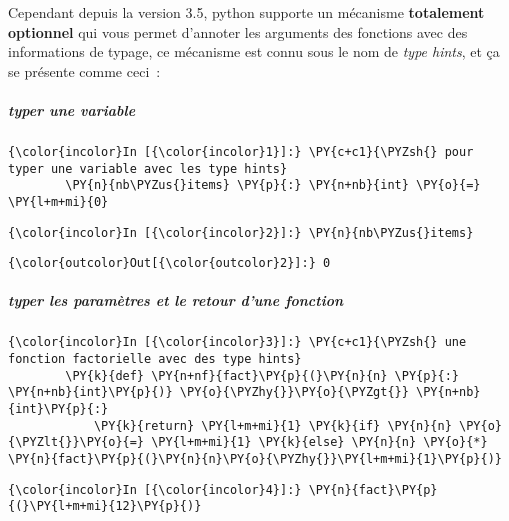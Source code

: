     Cependant depuis la version 3.5, python supporte un mécanisme
\textbf{totalement optionnel} qui vous permet d'annoter les arguments
des fonctions avec des informations de typage, ce mécanisme est connu
sous le nom de \emph{type hints}, et ça se présente comme ceci~:

    \hypertarget{typer-une-variable}{%
\subparagraph{typer une variable}\label{typer-une-variable}}

    \begin{Verbatim}[commandchars=\\\{\},frame=single,framerule=0.3mm,rulecolor=\color{cellframecolor}]
{\color{incolor}In [{\color{incolor}1}]:} \PY{c+c1}{\PYZsh{} pour typer une variable avec les type hints}
        \PY{n}{nb\PYZus{}items} \PY{p}{:} \PY{n+nb}{int} \PY{o}{=} \PY{l+m+mi}{0}
\end{Verbatim}


    \begin{Verbatim}[commandchars=\\\{\},frame=single,framerule=0.3mm,rulecolor=\color{cellframecolor}]
{\color{incolor}In [{\color{incolor}2}]:} \PY{n}{nb\PYZus{}items}
\end{Verbatim}


\begin{Verbatim}[commandchars=\\\{\},frame=single,framerule=0.3mm,rulecolor=\color{cellframecolor}]
{\color{outcolor}Out[{\color{outcolor}2}]:} 0
\end{Verbatim}
            
    \hypertarget{typer-les-paramuxe8tres-et-le-retour-dune-fonction}{%
\subparagraph{typer les paramètres et le retour d'une
fonction}\label{typer-les-paramuxe8tres-et-le-retour-dune-fonction}}

    \begin{Verbatim}[commandchars=\\\{\},frame=single,framerule=0.3mm,rulecolor=\color{cellframecolor}]
{\color{incolor}In [{\color{incolor}3}]:} \PY{c+c1}{\PYZsh{} une fonction factorielle avec des type hints}
        \PY{k}{def} \PY{n+nf}{fact}\PY{p}{(}\PY{n}{n} \PY{p}{:} \PY{n+nb}{int}\PY{p}{)} \PY{o}{\PYZhy{}}\PY{o}{\PYZgt{}} \PY{n+nb}{int}\PY{p}{:}
            \PY{k}{return} \PY{l+m+mi}{1} \PY{k}{if} \PY{n}{n} \PY{o}{\PYZlt{}}\PY{o}{=} \PY{l+m+mi}{1} \PY{k}{else} \PY{n}{n} \PY{o}{*} \PY{n}{fact}\PY{p}{(}\PY{n}{n}\PY{o}{\PYZhy{}}\PY{l+m+mi}{1}\PY{p}{)}
\end{Verbatim}


    \begin{Verbatim}[commandchars=\\\{\},frame=single,framerule=0.3mm,rulecolor=\color{cellframecolor}]
{\color{incolor}In [{\color{incolor}4}]:} \PY{n}{fact}\PY{p}{(}\PY{l+m+mi}{12}\PY{p}{)}
\end{Verbatim}


